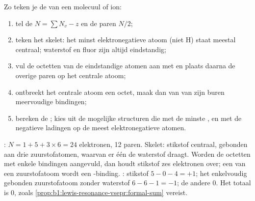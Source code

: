 \begin{method}\label{met:b1:lewis-resonance-vsepr:lewis}
Zo teken je de  van een molecuul of ion:
\begin{enumerate}
  \item tel de  $N = \sum N_v - z$ en de paren $N/2$;
  \item teken het skelet: het minst elektronegatieve atoom (niet H) staat
        meestal centraal; waterstof en fluor zijn altijd eindstandig;
  \item vul de octetten van de eindstandige atomen aan met  en
        plaats daarna de overige paren op het centrale atoom;
  \item ontbreekt het centrale atoom een octet, maak dan van 
        van zijn buren meervoudige bindingen;
  \item bereken de ; kies uit de mogelijke structuren die
        met de minste , en met de negatieve ladingen op
        de meest elektronegatieve atomen.
\end{enumerate}
\end{method}

\begin{example}[Salpeterzuur]\label{ex:b1:lewis-resonance-vsepr:hno3}
: $N = 1 + 5 + 3 \times 6 = 24$ elektronen, 12 paren. Skelet:
stikstof centraal, gebonden aan drie zuurstofatomen, waarvan er één de
waterstof draagt. Worden de octetten met enkele bindingen aangevuld, dan
houdt stikstof zes elektronen over; een  van een zuurstofatoom
wordt een -binding. : stikstof $5 - 0 - 4 = +1$;
het enkelvoudig gebonden zuurstofatoom zonder waterstof $6 - 6 - 1 = -1$;
de andere 0. Het totaal is 0, zoals
\cref{prop:b1:lewis-resonance-vsepr:formal-sum} vereist.
\end{example}

